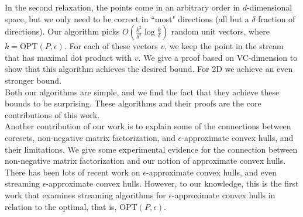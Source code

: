 In the second relaxation, the points come in an arbitrary order in $d$-dimensional space, but we only need to be correct in ``most" directions (all but a $\delta$ fraction of directions). Our algorithm picks $O(\frac{k^2}{\delta^2}\log{\frac{k}{\delta}})$ random unit vectors, where $k = \mbox{OPT}(P, \epsilon)$. For each of these vectors $v$, we keep the point in the stream that has maximal dot product with $v$. We give a proof based on VC-dimension to show that this algorithm achieves the desired bound. For 2D we achieve an even stronger bound.
\\

Both our algorithms are simple, and we find the fact that they achieve these bounds to be surprising. These algorithms and their proofs are the core contributions of this work.
\\

Another contribution of our work is to explain some of the connections between coresets, non-negative matrix factorization, and $\epsilon$-approximate convex hulls, and their limitations. We give some experimental evidence for the connection between non-negative matrix factorization and our notion of approximate convex hulls.
\\

There has been lots of recent work on $\epsilon$-approximate convex hulls, and even streaming $\epsilon$-approximate convex hulls. However, to our knowledge, this is the first work that examines streaming algorithms for $\epsilon$-approximate convex hulls in relation to the optimal, that is, OPT$(P, \epsilon)$.
